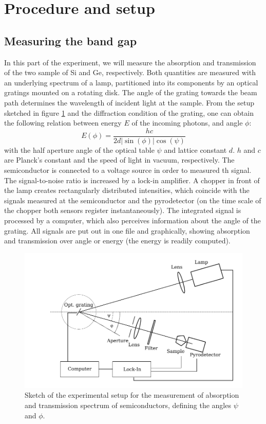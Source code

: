 \section{Procedure and setup}

\subsection{Measuring the band gap}
In this part of the experiment, we will measure the absorption and 
transmission of the two sample of Si and Ge, respectively. 
Both quantities are measured with an underlying spectrum of a lamp, 
partitioned into its components by an optical gratings mounted 
on a rotating disk. The angle of the grating towards the beam 
path determines the wavelength of incident light at the sample. 
From the setup sketched in figure \ref{fig:setup_band_gap} 
and the diffraction condition of the grating, one can obtain the following 
relation between energy $E$ of the incoming photons, and angle 
$\phi$:
\begin{equation}
    E(\phi) = \frac{h c}{2d |\sin(\phi)| \cos(\psi)}
    \label{eq:E_g}
\end{equation}
with the half aperture angle of the optical table $\psi$ and lattice 
constant $d$. $h$ and $c$ are Planck's constant and the speed of 
light in vacuum, respectively. The semiconductor is connected 
to a voltage source in order to measured th signal. 
The signal-to-noise ratio is increased by a lock-in amplifier. A chopper 
in front of the lamp creates rectangularly distributed intensities, 
which coincide with the signals measured at the semiconductor 
and the pyrodetector (on the time scale of the chopper 
    both sensors register instantaneously). 
The integrated signal is processed by a computer, which also
perceives information about the angle of the grating. 
All signals are put out in one file and graphically, showing absorption 
and transmission over angle or energy (the energy is readily computed). 

\begin{figure}
    \includegraphics[width=\textwidth]{figures/setup_band_gap}
    \caption{
        Sketch of the experimental setup for the measurement of 
        absorption and transmission spectrum of semiconductors, 
        defining the angles $\psi$ and $\phi$.
        }
    \label{fig:setup_band_gap}
\end{figure}

